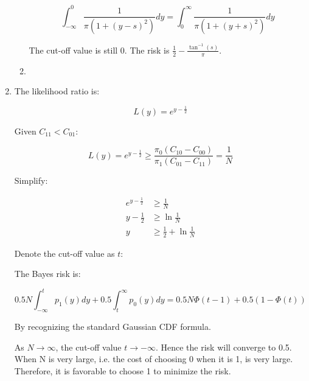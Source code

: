 \documentclass[11pt,letterpaper,titlepage]{article}
\begin{document}
\begin{enumerate}
\begin{enumerate}
        \begin{equation*}
            \int_{-\infty}^0 \frac{1}{\pi (1 + (y - s)^2)} dy = \int_0^{\infty} \frac{1}{\pi (1 + (y + s)^2)} dy
        \end{equation*}
        
        The cut-off value is still 0. The risk is $\frac{1}{2} - \frac{\tan^{-1} (s)}{\pi}$.
        
        \item %
        
        
        
    \end{enumerate}
    
    \item %
    
    The likelihood ratio is:
    
    \begin{equation*}
        L(y) = e^{y - \frac{1}{2}}
    \end{equation*}
    
    Given $C_{11} < C_{01}$:
    
    \begin{equation*}
        L(y) = e^{y - \frac{1}{2}} \geq \frac{\pi_0(C_{10} - C_{00})}{\pi_1(C_{01} - C_{11})} = \frac{1}{N}
    \end{equation*}
    
    Simplify:
    
    \begin{equation*}
        \begin{aligned}
            e^{y - \frac{1}{2}} &\geq \frac{1}{N} \\
            y - \frac{1}{2} &\geq \ln \frac{1}{N} \\
            y &\geq \frac{1}{2} + \ln \frac{1}{N}
        \end{aligned}
    \end{equation*}
    
    Denote the cut-off value as $t$:
    
    The Bayes risk is:
    
    \begin{equation*}
        0.5 N \int_{-\infty}^t p_1(y) dy + 0.5 \int_{t}^{\infty} p_0(y) dy = 0.5 N \Phi(t - 1) + 0.5 (1 - \Phi(t))
    \end{equation*}
    
    By recognizing the standard Gaussian CDF formula.
    
    As $N \rightarrow \infty$, the cut-off value $t \rightarrow -\infty$. Hence the risk will converge to 0.5. When N is very large, i.e. the cost of choosing 0 when it is 1, is very large. Therefore, it is favorable to choose 1 to minimize the risk.
    

\end{enumerate}
\end{document}
